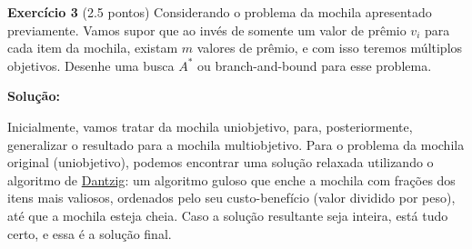 \noindent \textbf{Exercício 3} (2.5 pontos) Considerando o problema da mochila apresentado
previamente. Vamos supor que ao invés de somente um valor de prêmio
$v_i$ para cada item da mochila, existam $m$ valores de prêmio, e com isso
teremos múltiplos objetivos. Desenhe uma busca $A^\ast$ ou branch-and-bound
para esse problema.

\bigskip

\noindent \textbf{Solução:} 




Inicialmente, vamos tratar da mochila uniobjetivo, para, posteriormente, generalizar o resultado para a mochila multiobjetivo. Para o problema da mochila original (uniobjetivo), podemos encontrar uma solução relaxada utilizando o algoritmo de \href{https://en.wikipedia.org/wiki/Continuous_knapsack_problem}{Dantzig}: um algoritmo guloso que enche a mochila com frações dos itens mais valiosos, ordenados pelo seu custo-benefício (valor dividido por peso), até que a mochila esteja cheia. Caso a solução resultante seja inteira, está tudo certo, e essa é a solução final.

